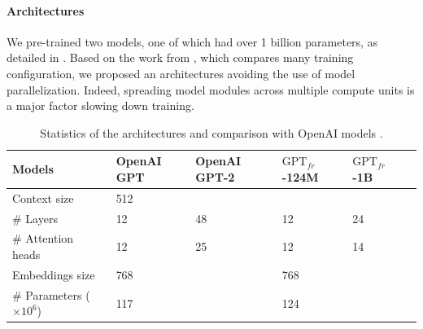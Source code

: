 \paragraph{Architectures} We pre-trained two models, one of which had over 1 billion parameters, as detailed in . Based on the work from \textcite{shoeybi_19}, which compares many training configuration, we proposed an architectures avoiding the use of model parallelization. Indeed, spreading model modules across multiple compute units is a major factor slowing down training. 

\begin{table}[!ht]
\centering
    \begin{tabularx}{\textwidth}{l|YYYYY}
    Models & OpenAI GPT &  OpenAI GPT-2 & $\text{GPT}_{fr}$-124M & $\text{GPT}_{fr}$-1B \\\hline
    Context size & 512 &  &  &  \\
    \# Layers & 12 & 48 & 12 & 24 \\
    \# Attention heads & 12 & 25 & 12 & 14 \\
    Embeddings size & 768 &  & 768 &  \\
    \# Parameters ($\times 10^6$) & 117 &  & 124 & \\
    \end{tabularx}
\caption{ Statistics of the architectures and comparison with OpenAI models \parencite{radford_2018, radford_2019}.}
\end{table}

